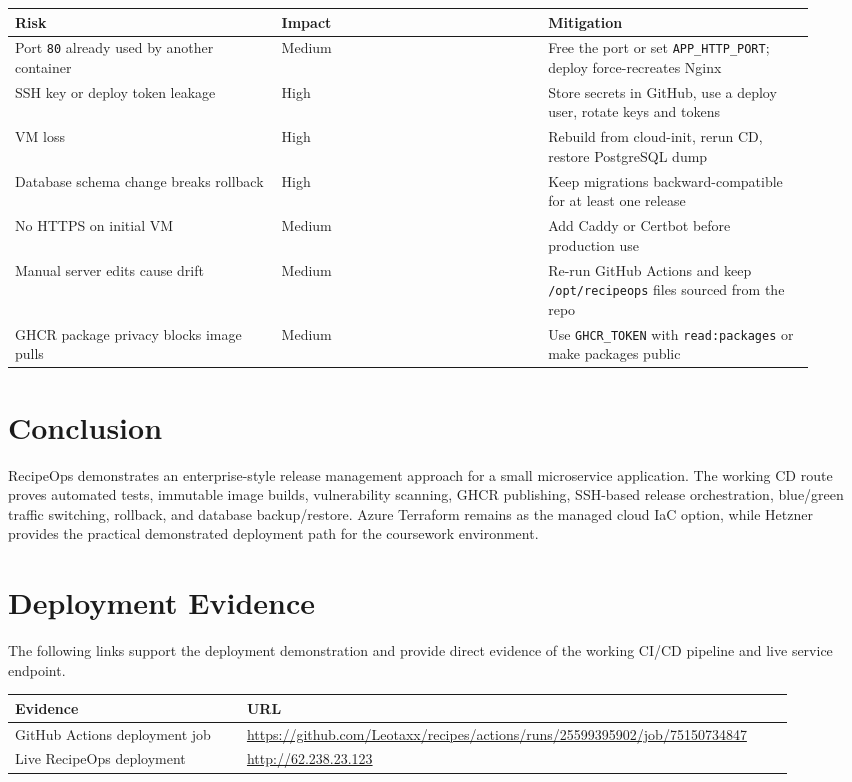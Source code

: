 \documentclass[11pt,a4paper]{article}
\begin{document}
\begin{longtable}{@{}>{\raggedright\arraybackslash}p{0.31\linewidth}>{\raggedright\arraybackslash}p{0.31\linewidth}>{\raggedright\arraybackslash}p{0.31\linewidth}@{}}
\toprule
\textbf{Risk} & \textbf{Impact} & \textbf{Mitigation} \\
\midrule
\endhead
Port \texttt{80} already used by another container & Medium & Free the port or set \texttt{APP\_HTTP\_PORT}; deploy force-recreates Nginx \\
SSH key or deploy token leakage & High & Store secrets in GitHub, use a deploy user, rotate keys and tokens \\
VM loss & High & Rebuild from cloud-init, rerun CD, restore PostgreSQL dump \\
Database schema change breaks rollback & High & Keep migrations backward-compatible for at least one release \\
No HTTPS on initial VM & Medium & Add Caddy or Certbot before production use \\
Manual server edits cause drift & Medium & Re-run GitHub Actions and keep \texttt{/opt/recipeops} files sourced from the repo \\
GHCR package privacy blocks image pulls & Medium & Use \texttt{GHCR\_TOKEN} with \texttt{read:packages} or make packages public \\
\bottomrule
\end{longtable}

\section{Conclusion}

RecipeOps demonstrates an enterprise-style release management approach for a small microservice application. The working CD route proves automated tests, immutable image builds, vulnerability scanning, GHCR publishing, SSH-based release orchestration, blue/green traffic switching, rollback, and database backup/restore. Azure Terraform remains as the managed cloud IaC option, while Hetzner provides the practical demonstrated deployment path for the coursework environment.

\appendix
\section{Deployment Evidence}

The following links support the deployment demonstration and provide direct evidence of the working CI/CD pipeline and live service endpoint.

\begin{longtable}{@{}>{\raggedright\arraybackslash}p{0.28\linewidth}>{\raggedright\arraybackslash}p{0.66\linewidth}@{}}
\toprule
\textbf{Evidence} & \textbf{URL} \\
\midrule
\endhead
GitHub Actions deployment job & \url{https://github.com/Leotaxx/recipes/actions/runs/25599395902/job/75150734847} \\
Live RecipeOps deployment & \url{http://62.238.23.123} \\
\bottomrule
\end{longtable}
\end{document}
